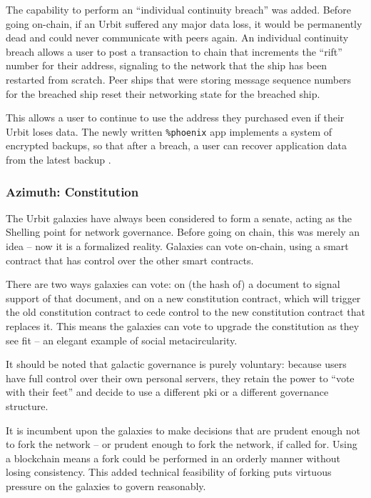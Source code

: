 \documentclass[twoside]{article}
\begin{document}
\sloppy
The capability to perform an ``individual continuity breach'' was added.  Before going on-chain, if an Urbit suffered any major data loss, it would be permanently dead and could never communicate with peers again.  An individual continuity breach allows a user to post a transaction to chain that increments the ``rift'' number for their address, signaling to the network that the ship has been restarted from scratch.  Peer ships that were storing message sequence numbers for the breached ship reset their networking state for the breached ship.

\sloppy
This allows a user to continue to use the address they purchased even if their Urbit loses data.  The newly written \lstinline[style=inlinecode]{%phoenix} app implements a system of encrypted backups, so that after a breach, a user can recover application data from the latest backup \citep{Wilson2024}.

\subsubsection{Azimuth: Constitution}

\sloppy
The Urbit galaxies have always been considered to form a senate, acting as the Shelling point for network governance.  Before going on chain, this was merely an idea – now it is a formalized reality.  Galaxies can vote on-chain, using a smart contract that has control over the other smart contracts.

There are two ways galaxies can vote: on (the hash of) a document to signal support of that document, and on a new constitution contract, which will trigger the old constitution contract to cede control to the new constitution contract that replaces it.  This means the galaxies can vote to upgrade the constitution as they see fit – an elegant example of social meta\-circularity.

It should be noted that galactic governance is purely voluntary: because users have full control over their own personal servers, they retain the power to ``vote with their feet'' and decide to use a different {\sc pki} or a different governance structure.

It is incumbent upon the galaxies to make decisions that are prudent enough not to fork the network – or prudent enough to fork the network, if called for.  Using a blockchain means a fork could be performed in an orderly manner without losing consistency.  This added technical feasibility of forking puts virtuous pressure on the galaxies to govern reasonably.
\end{document}
